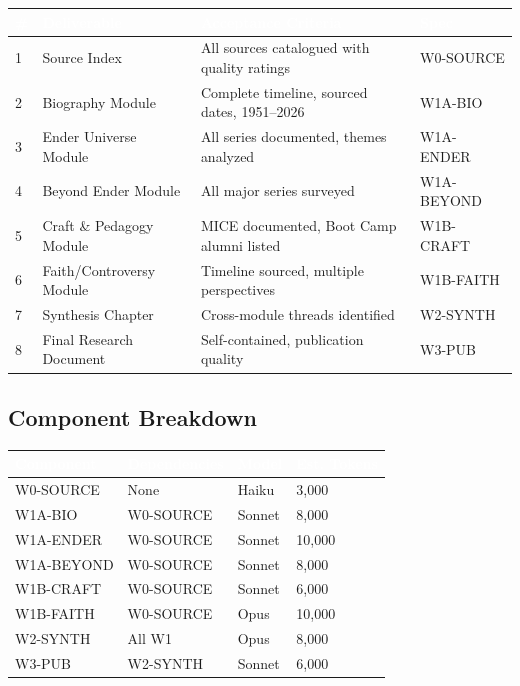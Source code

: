 \documentclass[11pt,letterpaper]{article}
\newcommand{\tableheader}[1]{\textbf{\sffamily\textcolor{white}{#1}}}
\begin{document}
\begin{center}
\begin{tabularx}{\textwidth}{C{0.5cm}L{3.5cm}X L{2.5cm}}
\toprule
{}
\tableheader{\#} & \tableheader{Deliverable} & \tableheader{Acceptance Criteria} & \tableheader{Spec} \\
 & Source Index & All sources catalogued with quality ratings & W0-SOURCE \\
2 & Biography Module & Complete timeline, sourced dates, 1951--2026 & W1A-BIO \\
3 & Ender Universe Module & All series documented, themes analyzed & W1A-ENDER \\
4 & Beyond Ender Module & All major series surveyed & W1A-BEYOND \\
5 & Craft \& Pedagogy Module & MICE documented, Boot Camp alumni listed & W1B-CRAFT \\
6 & Faith/Controversy Module & Timeline sourced, multiple perspectives & W1B-FAITH \\
7 & Synthesis Chapter & Cross-module threads identified & W2-SYNTH \\
8 & Final Research Document & Self-contained, publication quality & W3-PUB \\
\bottomrule
\end{tabularx}
\end{center}

\subsection{Component Breakdown}

\begin{center}
\begin{tabularx}{\textwidth}{L{3cm}L{2.5cm}C{1.5cm}C{2cm}}
\toprule
{}
\tableheader{Component} & \tableheader{Dependencies} & \tableheader{Model} & \tableheader{Est. Tokens} \\
\midrule
W0-SOURCE & None & Haiku & 3,000 \\
W1A-BIO & W0-SOURCE & Sonnet & 8,000 \\
W1A-ENDER & W0-SOURCE & Sonnet & 10,000 \\
W1A-BEYOND & W0-SOURCE & Sonnet & 8,000 \\
W1B-CRAFT & W0-SOURCE & Sonnet & 6,000 \\
W1B-FAITH & W0-SOURCE & Opus & 10,000 \\
W2-SYNTH & All W1 & Opus & 8,000 \\
W3-PUB & W2-SYNTH & Sonnet & 6,000 \\
\bottomrule
\end{tabularx}
\end{center}
\end{document}
